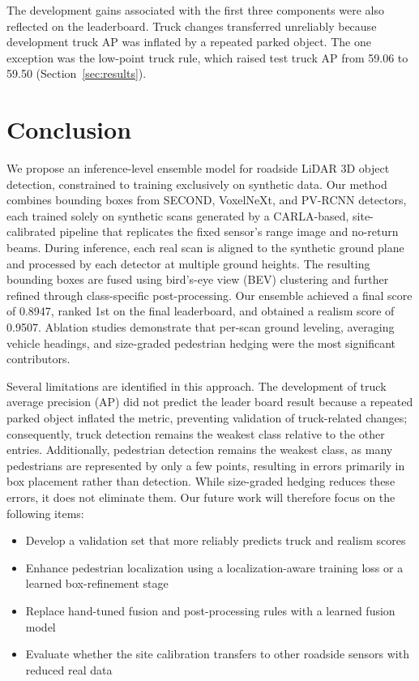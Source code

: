\documentclass[conference]{IEEEtran}
\begin{document}
The development gains associated with the first three components were also reflected on the leaderboard. Truck changes transferred unreliably because development truck AP was inflated by a repeated parked object. The one exception was the low-point truck rule, which raised test truck AP from 59.06 to 59.50 (Section~\ref{sec:results}).


\section{Conclusion}
\label{sec:conclusion}
We propose an inference-level ensemble model for roadside LiDAR 3D object detection, constrained to training exclusively on synthetic data. Our method combines bounding boxes from SECOND, VoxelNeXt, and PV-RCNN detectors, each trained solely on synthetic scans generated by a CARLA-based, site-calibrated pipeline that replicates the fixed sensor’s range image and no-return beams. During inference, each real scan is aligned to the synthetic ground plane and processed by each detector at multiple ground heights. The resulting bounding boxes are fused using bird’s-eye view (BEV) clustering and further refined through class-specific post-processing. Our ensemble achieved a final score of 0.8947, ranked 1st on the final leaderboard, and obtained a realism score of 0.9507. Ablation studies demonstrate that per-scan ground leveling, averaging vehicle headings, and size-graded pedestrian hedging were the most significant contributors.

Several limitations are identified in this approach. The development of truck average precision (AP) did not predict the leader board result because a repeated parked object inflated the metric, preventing validation of truck-related changes; consequently, truck detection remains the weakest class relative to the other entries. Additionally, pedestrian detection remains the weakest class, as many pedestrians are represented by only a few points, resulting in errors primarily in box placement rather than detection. While size-graded hedging reduces these errors, it does not eliminate them. Our future work will therefore focus on the following items:

\begin{itemize}
    \item Develop a validation set that more reliably predicts truck and realism scores
    \item Enhance pedestrian localization using a localization-aware training loss or a learned box-refinement stage
    \item Replace hand-tuned fusion and post-processing rules with a learned fusion model
    \item Evaluate whether the site calibration transfers to other roadside sensors with reduced real data
\end{itemize}
\end{document}
